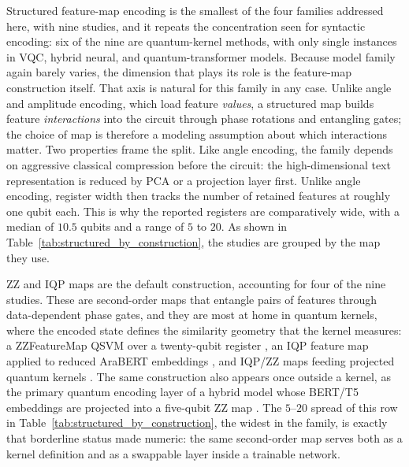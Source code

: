 \documentclass{ieeeaccess}
\begin{document}
Structured feature-map encoding is the smallest of the four families addressed here, with nine studies, and it repeats the concentration seen for syntactic encoding: six of the nine are quantum-kernel methods, with only single instances in VQC, hybrid neural, and quantum-transformer models. Because model family again barely varies, the dimension that plays its role is the feature-map construction itself. That axis is natural for this family in any case. Unlike angle and amplitude encoding, which load feature \emph{values}, a structured map builds feature \emph{interactions} into the circuit through phase rotations and entangling gates; the choice of map is therefore a modeling assumption about which interactions matter. Two properties frame the split. Like angle encoding, the family depends on aggressive classical compression before the circuit: the high-dimensional text representation is reduced by PCA or a projection layer first. Unlike angle encoding, register width then tracks the number of retained features at roughly one qubit each. This is why the reported registers are comparatively wide, with a median of $10.5$ qubits and a range of $5$ to $20$. As shown in Table~\ref{tab:structured_by_construction}, the studies are grouped by the map they use.

ZZ and IQP maps are the default construction, accounting for four of the nine studies. These are second-order maps that entangle pairs of features through data-dependent phase gates, and they are most at home in quantum kernels, where the encoded state defines the similarity geometry that the kernel measures: a ZZFeatureMap QSVM over a twenty-qubit register \cite{widdows_near-term_2024}, an IQP feature map applied to reduced AraBERT embeddings \cite{djemmal_arabert-qc_2025}, and IQP/ZZ maps feeding projected quantum kernels \cite{keith-norambuena_quantum_2026}. The same construction also appears once outside a kernel, as the primary quantum encoding layer of a hybrid model whose BERT/T5 embeddings are projected into a five-qubit ZZ map \cite{baik_neural_2025}. The $5$--$20$ spread of this row in Table~\ref{tab:structured_by_construction}, the widest in the family, is exactly that borderline status made numeric: the same second-order map serves both as a kernel definition and as a swappable layer inside a trainable network.
\end{document}
